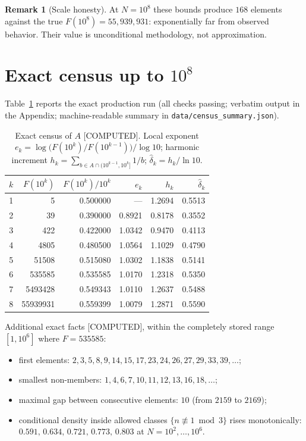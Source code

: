 \documentclass[11pt]{article}
\theoremstyle{definition}
\newtheorem{remark}[theorem]{Remark}
\newcommand{\A}{A}
\newcommand{\F}{F}
\begin{document}
\begin{remark}[Scale honesty]
At $N=10^8$ these bounds produce $168$ elements against the true
$\F(10^8)=55{,}939{,}931$: exponentially far from observed behavior. Their
value is unconditional methodology, not approximation.
\end{remark}

\section{Exact census up to \texorpdfstring{$10^8$}{10\^{}8}}\label{sec:census}

Table~\ref{tab:census} reports the exact production run (all checks passing;
verbatim output in the Appendix; machine-readable summary in
\texttt{data/census\_summary.json}).

\begin{table}[ht]
\centering
\caption{Exact census of $\A$ [COMPUTED]. Local exponent
$e_k=\log\!\bigl(\F(10^k)/\F(10^{k-1})\bigr)/\log 10$; harmonic increment
$h_k=\sum_{b\in\A\cap(10^{k-1},10^k]}1/b$; $\hat\delta_k=h_k/\ln 10$.}
\label{tab:census}
\begin{tabular}{rrrrrr}
\toprule
$k$ & $\F(10^k)$ & $\F(10^k)/10^k$ & $e_k$ & $h_k$ & $\hat\delta_k$\\
\midrule
1 & 5 & 0.500000 & --- & 1.2694 & 0.5513\\
2 & 39 & 0.390000 & 0.8921 & 0.8178 & 0.3552\\
3 & 422 & 0.422000 & 1.0342 & 0.9470 & 0.4113\\
4 & 4805 & 0.480500 & 1.0564 & 1.1029 & 0.4790\\
5 & 51508 & 0.515080 & 1.0302 & 1.1838 & 0.5141\\
6 & 535585 & 0.535585 & 1.0170 & 1.2318 & 0.5350\\
7 & 5493428 & 0.549343 & 1.0110 & 1.2637 & 0.5488\\
8 & 55939931 & 0.559399 & 1.0079 & 1.2871 & 0.5590\\
\bottomrule
\end{tabular}
\end{table}

Additional exact facts [COMPUTED], within the completely stored range
$[1,10^6]$ where $\F=535585$:
\begin{itemize}
\item first elements: $2,3,5,8,9,14,15,17,23,24,26,27,29,33,39,\dots$;
\item smallest non-members: $1,4,6,7,10,11,12,13,16,18,\dots$;
\item maximal gap between consecutive elements: $10$ (from $2159$ to $2169$);
\item conditional density inside allowed classes $\{n\not\equiv1\bmod3\}$
rises monotonically: $0.591,\,0.634,\,0.721,\,0.773,\,0.803$ at
$N=10^2,\dots,10^6$.
\end{itemize}
\end{document}
